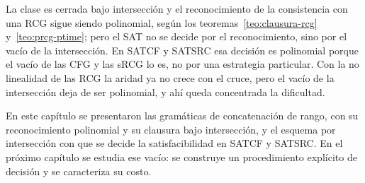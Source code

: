 La clase es cerrada bajo intersección y el reconocimiento de la
consistencia con una RCG sigue siendo polinomial, según los
teoremas~\ref{teo:clausura-rcg} y~\ref{teo:prcg-ptime}; pero el SAT no se
decide por el reconocimiento, sino por el vacío de la intersección. En SATCF y SATSRC
esa decisión es polinomial porque el vacío de las CFG y las sRCG lo es,
no por una estrategia particular. Con la no linealidad de las RCG la
aridad ya no crece con el cruce, pero el vacío de la intersección deja de
ser polinomial, y ahí queda concentrada la dificultad.

En este capítulo se presentaron las gramáticas de concatenación de
rango, con su reconocimiento polinomial y su clausura bajo intersección,
y el esquema por intersección con que se decide la satisfacibilidad en
SATCF y SATSRC. En el próximo capítulo se estudia ese vacío: se
construye un procedimiento explícito de decisión y se caracteriza su
costo.

